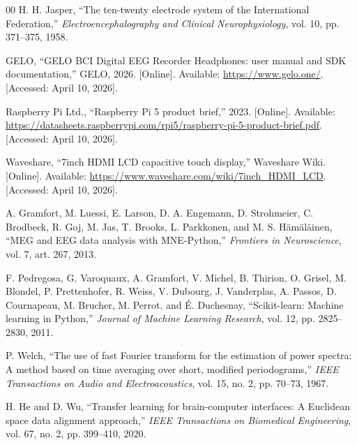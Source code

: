 \begin{thebibliography}{00}
H. H. Jasper, ``The ten-twenty electrode system of the International Federation,''
\textit{Electroencephalography and Clinical Neurophysiology}, vol. 10,
pp. 371--375, 1958.

GELO, ``GELO BCI Digital EEG Recorder Headphones: user manual and SDK
documentation,'' GELO, 2026. [Online]. Available: \url{https://www.gelo.one/}.
[Accessed: April 10, 2026].

Raspberry Pi Ltd., ``Raspberry Pi 5 product brief,'' 2023. [Online]. Available:
\url{https://datasheets.raspberrypi.com/rpi5/raspberry-pi-5-product-brief.pdf}.
[Accessed: April 10, 2026].

Waveshare, ``7inch HDMI LCD capacitive touch display,'' Waveshare Wiki. [Online].
Available: \url{https://www.waveshare.com/wiki/7inch_HDMI_LCD}.
[Accessed: April 10, 2026].

A. Gramfort, M. Luessi, E. Larson, D. A. Engemann, D. Strohmeier, C. Brodbeck,
R. Goj, M. Jas, T. Brooks, L. Parkkonen, and M. S. H\"{a}m\"{a}l\"{a}inen,
``MEG and EEG data analysis with MNE-Python,'' \textit{Frontiers in Neuroscience},
vol. 7, art. 267, 2013.

F. Pedregosa, G. Varoquaux, A. Gramfort, V. Michel, B. Thirion, O. Grisel,
M. Blondel, P. Prettenhofer, R. Weiss, V. Dubourg, J. Vanderplas, A. Passos,
D. Cournapeau, M. Brucher, M. Perrot, and \'{E}. Duchesnay, ``Scikit-learn:
Machine learning in Python,'' \textit{Journal of Machine Learning Research},
vol. 12, pp. 2825--2830, 2011.


P. Welch, ``The use of fast Fourier transform for the estimation of power spectra:
A method based on time averaging over short, modified periodograms,''
\textit{IEEE Transactions on Audio and Electroacoustics}, vol. 15, no. 2,
pp. 70--73, 1967.

H. He and D. Wu, ``Transfer learning for brain-computer interfaces: A Euclidean space
data alignment approach,'' \textit{IEEE Transactions on Biomedical Engineering}, vol. 67,
no. 2, pp. 399--410, 2020.

\end{thebibliography}
